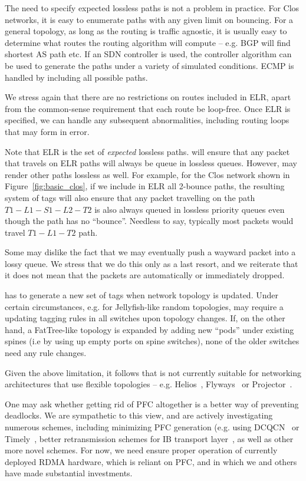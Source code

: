  The need to specify expected lossless paths is not a
problem in practice. For Clos networks, it is easy to enumerate paths with any
given limit on bouncing. For a general topology, as long as the routing is
traffic agnostic, it is usually easy to determine what routes the routing
algorithm will compute -- e.g. BGP will find shortest AS path etc.  If an
SDN controller is used, the controller algorithm can be used to generate the
paths under a variety of simulated conditions. ECMP is handled by including all possible
paths.

We stress again that there are no restrictions on routes included in ELR, apart
from the common-sense requirement that each route be loop-free. Once ELR is
specified, we can handle any subsequent abnormalities, including routing loops
that may form in error. 

Note that ELR is the set of {\em expected} lossless paths. \sysname{} will
ensure that any packet that travels on ELR paths will always be queue in
lossless queues. However, \sysname{} may render other paths lossless as well.
For example, for the Clos network shown in Figure~\ref{fig:basic_clos}, if we
include in ELR all 2-bounce paths, the resulting system of tags will also ensure
that any packet travelling on the path $T1-L1-S1-L2-T2$ is also always queued in
lossless priority queues even though the path has no ``bounce''. Needless to
say, typically most packets would travel $T1-L1-T2$ path.

 Some may dislike the fact that we may eventually push
a wayward packet into a lossy queue. We stress that we do this only as a last
resort, and we reiterate that it does not mean that the packets are
automatically or immediately dropped.

 \sysname{} has to generate a new set of
tags when network topology is updated. Under certain circumstances, e.g.  for
Jellyfish-like random topologies, \sysname{} may require a updating tagging
rules in all switches upon topology changes.  If, on the other hand, a
FatTree-like topology is expanded by adding new ``pods'' under existing spines
(i.e by using up empty ports on spine switches), none of the older switches need
any rule changes.

 Given the above limitation, it follows that \sysname{}
is not currently suitable for networking architectures that use flexible 
topologies -- e.g. Helios~\cite{helios}, Flyways~\cite{flyways} or
Projector~\cite{projector}. 

 One may ask whether getting rid of PFC altogether is a
better way of preventing deadlocks.  We are sympathetic to this view, and are
actively investigating numerous schemes, including minimizing PFC generation
(e.g.  using DCQCN~\cite{dcqcn} or Timely~\cite{timely}, better retransmission
schemes for IB transport layer~\cite{roce}, as well as other more novel schemes.
For now, we need \sysname{} ensure proper operation of currently deployed RDMA
hardware, which is reliant on PFC, and in which we and others have made
substantial investments.

